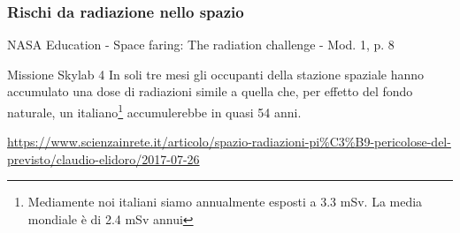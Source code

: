 \documentclass[9pt]{beamer}
\begin{document}
\begin{frame} [fragile]
	\frametitle{Rischi da radiazione nello spazio}
	\begin{exampleblock}{NASA Education - Space faring: The radiation challenge - Mod. 1, p. 8}
\begin{center} 
\linebreak
\end{center} 
\end{exampleblock}
	\begin{alertblock}{Missione Skylab 4}
	In soli tre mesi gli occupanti della stazione spaziale hanno accumulato una dose di radiazioni simile a quella che, per effetto del fondo naturale, un italiano\footnote{Mediamente noi italiani siamo annualmente esposti a 3.3 mSv. La media mondiale \`e di 2.4 mSv annui} accumulerebbe in quasi 54 anni.
\end{alertblock}


\url{https://www.scienzainrete.it/articolo/spazio-radiazioni-pi%C3%B9-pericolose-del-previsto/claudio-elidoro/2017-07-26}
\end{frame}

\end{document}
